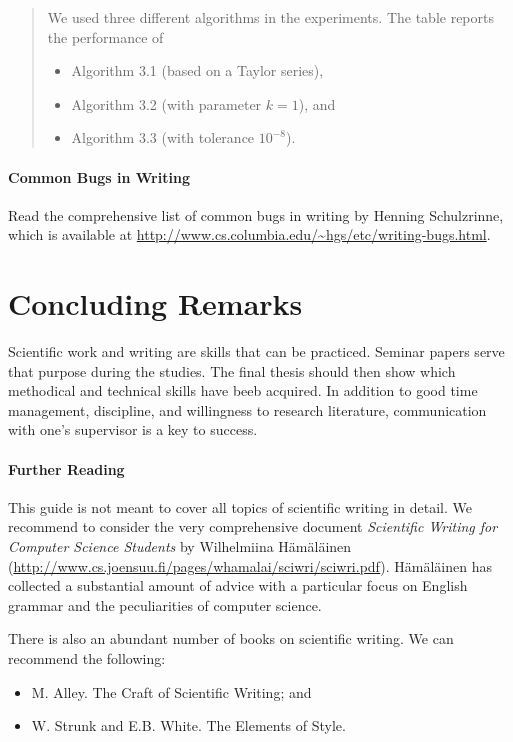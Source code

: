\begin{quote}
  We used three different algorithms in the experiments. The table reports the performance of
\begin{itemize}
\item Algorithm 3.1 (based on a Taylor series),
\item Algorithm 3.2 (with parameter \(k = 1\)), and
\item Algorithm 3.3 (with tolerance \(10^{-8}\)).
\end{itemize}
\end{quote}

\paragraph{Common Bugs in Writing}
\label{par:commonbugs}
Read the comprehensive list of common bugs in writing by Henning Schulzrinne, which is available at \url{http://www.cs.columbia.edu/~hgs/etc/writing-bugs.html}.

\section{Concluding Remarks}

Scientific work and writing are skills that can be practiced. Seminar papers serve that purpose during the studies. The final thesis should then show which methodical and technical skills have beeb acquired. In addition to good time management, discipline, and willingness to research literature, communication with one's supervisor is a key to success.

\paragraph{Further Reading}

This guide is not meant to cover all topics of scientific writing in detail. We recommend to consider the very comprehensive document \emph{Scientific Writing for Computer Science Students} by Wilhelmiina Hämäläinen (\url{http://www.cs.joensuu.fi/pages/whamalai/sciwri/sciwri.pdf}). Hämäläinen has collected a substantial amount of advice with a particular focus on English grammar and the peculiarities of computer science.

There is also an abundant number of books on scientific writing. We can recommend the following:
\begin{itemize}
\item M. Alley. The Craft of Scientific Writing; and
\item W. Strunk and E.B. White. The Elements of Style.
\end{itemize}

